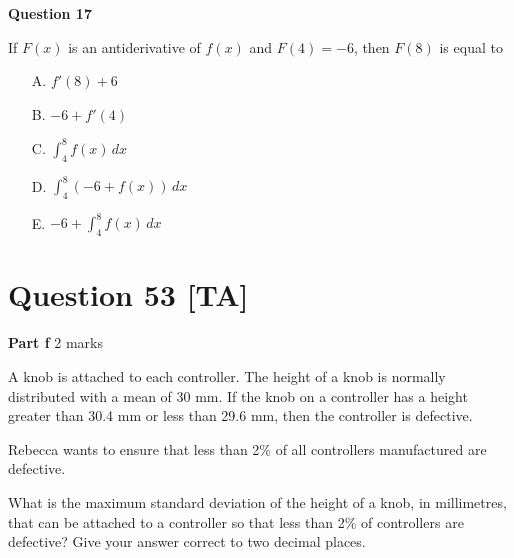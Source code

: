 \documentclass[10pt,a4paper]{article}
\begin{document}
\textbf{Question 17}

If $F(x)$ is an antiderivative of $f(x)$ and $F(4) = -6$, then $F(8)$ is equal to

\begin{enumerate}
    \item[A.] $f'(8) + 6$
    \item[B.] $-6 + f'(4)$
    \item[C.] $\int_4^8 f(x)\,dx$
    \item[D.] $\int_4^8 (-6 + f(x))\,dx$
    \item[E.] $-6 + \int_4^8 f(x)\,dx$
\end{enumerate}

\vspace{9\baselineskip}

\hrulefill

\section*{Question 53 [TA]}

\textbf{Part f} \hfill 2 marks

A knob is attached to each controller. The height of a knob is normally distributed with a mean of 30 mm. If the knob on a controller has a height greater than 30.4 mm or less than 29.6 mm, then the controller is defective.

Rebecca wants to ensure that less than 2\% of all controllers manufactured are defective.

What is the maximum standard deviation of the height of a knob, in millimetres, that can be attached to a controller so that less than 2\% of controllers are defective? Give your answer correct to two decimal places.

\vspace{9\baselineskip}
\end{document}

